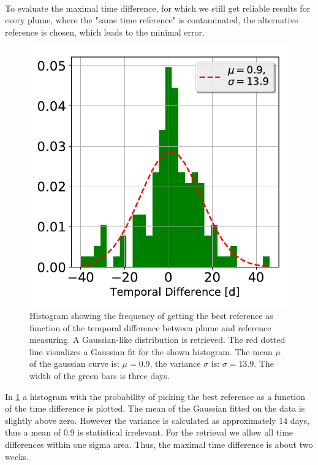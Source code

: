 \\
To evaluate the maximal time difference, for which we still get reliable results for every plume, where the "same time reference" is contaminated, the alternative reference is chosen, which leads to the minimal  error.\\
\begin{figure}
	\centering
	\includegraphics[width=0.6\linewidth]{Bilder/Hist}
	\caption{Histogram showing the frequency of getting the best reference as function of the temporal difference between plume and reference measuring. A Gaussian-like distribution is retrieved. The red dotted line visualizes a Gaussian fit for the shown histogram. The mean $\mu$ of the gaussian curve is: $\mu = 0.9$, the variance $\sigma$ is: $\sigma = 13.9$. The width of the green bars is three days.}
	\label{fig:Hist}
\end{figure}
%
In \cref{fig:Hist} a histogram with the probability of picking the best reference as a function of the time difference is plotted. The mean of the Gaussian fitted on the data is slightly above zero. However the variance is calculated as approximately 14 days, thus a mean of 0.9 is statistical irrelevant. For the retrieval we allow all time differences within one sigma area. Thus, the maximal time difference is about two weeks.\\

